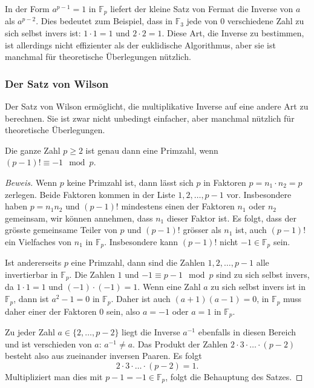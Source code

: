 In der Form $a^{p-1}=1$ in $\mathbb{F}_p$ liefert der kleine Satz
von Fermat die Inverse von $a$ als $a^{p-2}$.
Dies bedeutet zum Beispiel, dass in $\mathbb{F}_3$ jede von $0$
verschiedene Zahl zu sich selbst invers ist: $1\cdot 1=1$ und $2\cdot 2=1$.
Diese Art, die Inverse zu bestimmen, ist allerdings nicht effizienter
als der euklidische Algorithmus, aber sie ist manchmal für
theoretische Überlegungen nützlich.

\subsubsection{Der Satz von Wilson}
Der Satz von Wilson ermöglicht, die multiplikative Inverse auf eine
andere Art zu berechnen.
Sie ist zwar nicht unbedingt einfacher, aber manchmal nützlich für
theoretische Überlegungen.

\begin{satz}[Wilson]
Die ganze Zahl $p\ge 2$ ist genau dann eine Primzahl, wenn
$(p-1)!\equiv -1\mod p$.
\end{satz}

\begin{proof}[Beweis]
Wenn $p$ keine Primzahl ist, dann lässt sich $p$ in Faktoren
$p=n_1\cdot n_2=p$ zerlegen.
Beide Faktoren kommen in der Liste $1,2,\dots,p-1$ vor.
Insbesondere haben $p=n_1n_2$ und $(p-1)!$ mindestens einen
der Faktoren $n_1$ oder $n_2$ gemeinsam, wir können annehmen,
dass $n_1$ dieser Faktor ist.
Es folgt, dass der grösste gemeinsame Teiler von $p$ und $(p-1)!$
grösser als $n_1$ ist, auch $(p-1)!$ ein Vielfaches von $n_1$ in
$\mathbb{F}_p$.
Insbesondere kann $(p-1)!$ nicht $-1\in\mathbb{F}_p$ sein.

Ist andererseits $p$ eine Primzahl, dann sind die Zahlen $1, 2,\dots,p-1$
alle invertierbar in $\mathbb{F}_p$.
Die Zahlen $1$ und $-1\equiv p-1\mod p$ sind zu sich selbst invers,
da $1\cdot 1=1$ und $(-1)\cdot(-1)=1$.
Wenn eine Zahl $a$ zu sich selbst invers ist in $\mathbb{F}_p$,
dann ist $a^2-1=0$ in $\mathbb{F}_p$.
Daher ist auch $(a+1)(a-1)=0$, in $\mathbb{F}_p$ muss daher einer
der Faktoren $0$ sein, also $a=-1$ oder $a=1$ in $\mathbb{F}_p$.

Zu jeder Zahl $a\in\{2,\dots,p-2\}$ liegt die Inverse $a^{-1}$
ebenfalls in diesen Bereich und ist verschieden von $a$: $a^{-1}\ne a$.
Das Produkt der Zahlen
$2\cdot 3 \cdot\ldots\cdot (p-2)$ besteht also aus zueinander inversen
Paaren.
Es folgt
\[
2\cdot 3 \cdot\ldots\cdot (p-2) = 1.
\]
Multipliziert man dies mit $p-1=-1\in\mathbb{F}_p$, folgt
die Behauptung des Satzes.
\end{proof}

